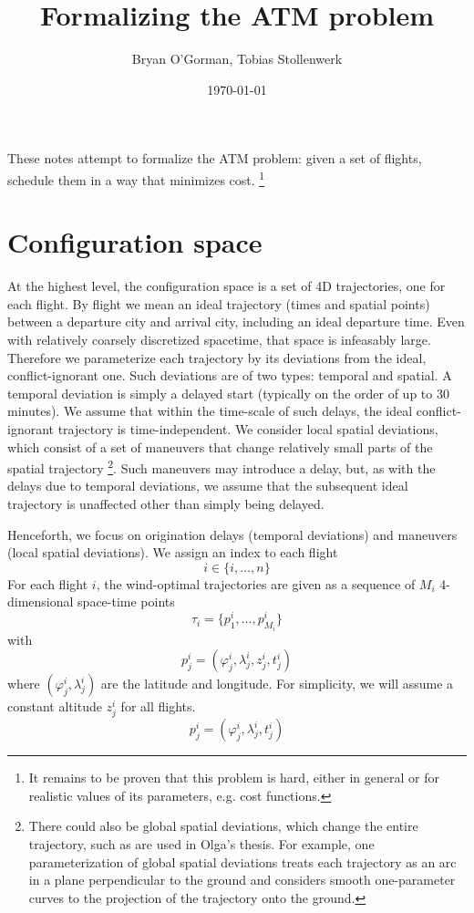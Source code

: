 \documentclass{article}
\title{Formalizing the ATM problem}
\author{Bryan O'Gorman, Tobias Stollenwerk}
\date{\today}
\begin{document}
\maketitle

These notes attempt to formalize the ATM problem: given a set of flights, schedule them in a way that minimizes cost.
\footnote{It remains to be proven that this problem is hard, either in general or for realistic values of its parameters, e.g. cost functions.}

\section{Configuration space}

At the highest level, the configuration space is a set of 4D trajectories, one for each flight.
By flight we mean an ideal trajectory (times and spatial points) between a 
departure city and arrival city, including an ideal departure time.
Even with relatively coarsely discretized spacetime, that space is infeasably large.
Therefore we parameterize each trajectory by its deviations from the ideal, conflict-ignorant one.
Such deviations are of two types: temporal and spatial. 
A temporal deviation is simply a delayed start (typically on the order of up to 30 minutes). 
We assume that within the time-scale of such delays, the ideal conflict-ignorant trajectory is time-independent.
We consider local spatial deviations, which consist of a set of
maneuvers that change relatively small parts of the spatial trajectory
\footnote{ There could also be global 
spatial deviations, which change the entire trajectory, such as are
used in Olga's thesis.
For example, one parameterization of global spatial deviations treats each
trajectory as an arc in a plane perpendicular to the ground and considers
smooth one-parameter curves to the projection of the trajectory onto the
ground.}.  
Such maneuvers may
introduce a delay, but, as with the delays due to temporal
deviations, we assume that the subsequent ideal trajectory is unaffected 
other than simply being delayed.

Henceforth, we focus on origination delays (temporal deviations) and maneuvers (local spatial deviations).
We assign an index to each flight
\begin{equation*}
    i \in \{i, \dots, n\}
\end{equation*}
For each flight $i$, the wind-optimal trajectories are given as a sequence of $M_i$ 4-dimensional space-time points
\begin{equation*}
    \tau_i = \{p^i_1, \dots, p^i_{M_i}\}
\end{equation*}
with
\begin{equation*}
    p^i_j = \left( \varphi^i_j, \lambda^i_j, z^i_j, t^i_j \right)
\end{equation*}
where $(\varphi^i_j, \lambda^i_j)$ are the latitude and longitude.
For simplicity, we will assume a constant altitude $z^i_j$ for all flights.
\begin{equation*}
    p^i_j = \left( \varphi^i_j, \lambda^i_j, t^i_j \right)
\end{equation*}
\end{document}
